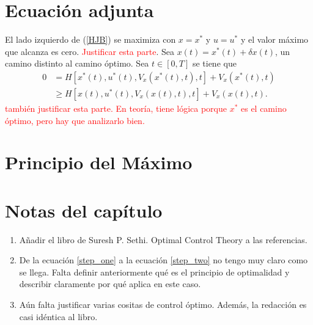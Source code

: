 \section{Ecuación adjunta}
El lado izquierdo de (\ref{HJB}) se maximiza con $x = x^*$ y $u = u^*$ y el valor máximo que alcanza es cero. \textcolor{red}{Justificar esta parte}. Sea $x(t) = x^*(t) + \delta x(t)$, un camino distinto al camino óptimo. Sea $t\in [0,T]$  se tiene que 
\begin{align}
    0 &= H[x^*(t), u^*(t), V_x(x^*(t), t), t] + V_x(x^*(t),  t) \\
     &\geq H[x(t), u^*(t), V_x(x(t), t), t] + V_x(x(t), t).
\end{align}
\textcolor{red}{también justificar esta parte. En teoría, tiene lógica porque $x^*$ es el camino óptimo, pero hay que analizarlo bien.}
\section{Principio del Máximo}

 \section{Notas del capítulo}
 \begin{enumerate}
     \item Añadir el libro de Suresh P. Sethi. Optimal Control Theory a las referencias.
     \item De la ecuación \ref{step_one} a la ecuación \ref{step_two} no tengo muy claro como se llega. Falta definir anteriormente qué es el principio de optimalidad y describir claramente por qué aplica en este caso. 
     \item Aún falta justificar varias cositas de control óptimo. Además, la redacción es casi idéntica al libro.
 \end{enumerate}
